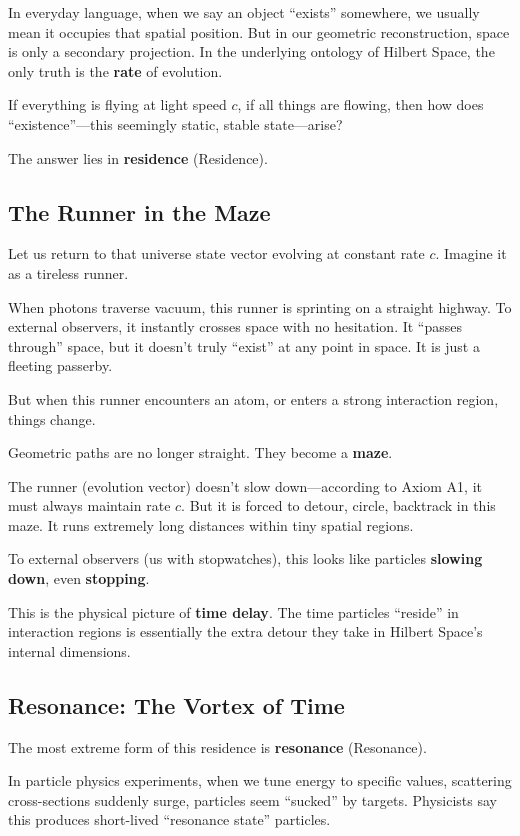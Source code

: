 \documentclass[11pt,a4paper,twoside]{book}
\begin{document}
In everyday language, when we say an object ``exists'' somewhere, we usually mean it occupies that spatial position. But in our geometric reconstruction, space is only a secondary projection. In the underlying ontology of Hilbert Space, the only truth is the \textbf{rate} of evolution.

If everything is flying at light speed $c$, if all things are flowing, then how does ``existence''---this seemingly static, stable state---arise?

The answer lies in \textbf{residence} (Residence).

\subsection{The Runner in the Maze}

Let us return to that universe state vector evolving at constant rate $c$. Imagine it as a tireless runner.

When photons traverse vacuum, this runner is sprinting on a straight highway. To external observers, it instantly crosses space with no hesitation. It ``passes through'' space, but it doesn't truly ``exist'' at any point in space. It is just a fleeting passerby.

But when this runner encounters an atom, or enters a strong interaction region, things change.

Geometric paths are no longer straight. They become a \textbf{maze}.

The runner (evolution vector) doesn't slow down---according to Axiom A1, it must always maintain rate $c$. But it is forced to detour, circle, backtrack in this maze. It runs extremely long distances within tiny spatial regions.

To external observers (us with stopwatches), this looks like particles \textbf{slowing down}, even \textbf{stopping}.

This is the physical picture of \textbf{time delay}. The time particles ``reside'' in interaction regions is essentially the extra detour they take in Hilbert Space's internal dimensions.

\subsection{Resonance: The Vortex of Time}

The most extreme form of this residence is \textbf{resonance} (Resonance).

In particle physics experiments, when we tune energy to specific values, scattering cross-sections suddenly surge, particles seem ``sucked'' by targets. Physicists say this produces short-lived ``resonance state'' particles.
\end{document}
